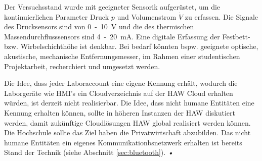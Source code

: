 Der Versuchsstand wurde mit geeigneter Sensorik aufgerüstet, um die kontinuierlichen Parameter Druck $p$ und Volumenstrom $\dot{V}$ zu erfassen. Die Signale des Drucksensors sind von 0~-~10~V und die des thermischen Massendurchflusssensors sind 4~-~20~mA. Eine digitale Erfassung der Festbett- bzw. Wirbelschichthöhe ist denkbar. Bei bedarf könnten bspw. geeignete optische, akustische, mechanische Entfernungsmesser, im Rahmen einer studentischen Projektarbeit, recherchiert und umgesetzt werden.



Die Idee, dass jeder Laboraccount eine eigene Kennung erhält, wodurch die Laborgeräte wie HMI's ein Cloudverzeichnis auf der HAW Cloud erhalten würden, ist derzeit nicht realisierbar. Die Idee, dass nicht humane Entitäten eine Kennung erhalten können, sollte in höheren Instanzen der HAW diskutiert werden, damit zukünftige Cloudlösungen HAW global realisiert werden können. Die Hochschule sollte das Ziel haben die Privatwirtschaft abzubilden. Das nicht humane Entitäten ein eigenes Kommunikationbsnetzwerk erhalten ist bereits Stand der Technik (siehe Abschnitt \ref{sec:bluetooth}). \textsl{•}





